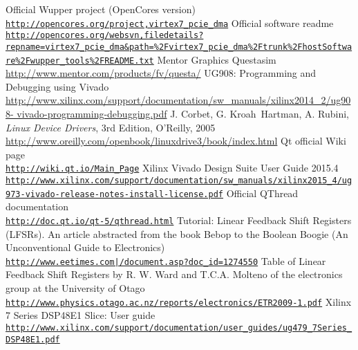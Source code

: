 \begin{thebibliography}{9}
  Official Wupper project (OpenCores version)\\
  \href{http://opencores.org/project,virtex7_pcie_dma}{\nolinkurl{http://opencores.org/project,virtex7\_pcie\_dma}}
  Official software readme\\
  \href{http://opencores.org/websvn,filedetails?repname=virtex7\_pcie\_dma&path=\%2Fvirtex7_pcie_dma\%2Ftrunk\%2FhostSoftware\%2Fwupper_tools\%2FREADME.txt}{\nolinkurl{http://opencores.org/websvn,filedetails?repname=virtex7_pcie_dma&path=\%2Fvirtex7_pcie_dma\%2Ftrunk\%2FhostSoftware\%2Fwupper_tools\%2FREADME.txt}}
  Mentor Graphics Questasim\\
  \href{http://www.mentor.com/products/fv/questa/}{http://www.mentor.com/products/fv/questa/}
  UG908: Programming and Debugging using Vivado\\
  \href{http://www.xilinx.com/support/documentation/sw_manuals/xilinx2014_2/ug908-vivado-programming-debugging.pdf}{http://www.xilinx.com/support/documentation/sw\_manuals/xilinx2014\_2/ug908- vivado-programming-debugging.pdf}
  J. Corbet, G. Kroah\ Hartman, A. Rubini, \textit{Linux Device Drivers}, 3rd Edition, O'Reilly, 2005\\
  \href{http://www.oreilly.com/openbook/linuxdrive3/book/index.html}{http://www.oreilly.com/openbook/linuxdrive3/book/index.html}
  Qt official Wiki page\\
  \href{http://wiki.qt.io/Main_Page}{\nolinkurl{http://wiki.qt.io/Main\_Page}}
  Xilinx Vivado Design Suite User Guide 2015.4\\
  \href{http://www.xilinx.com/support/documentation/sw_manuals/xilinx2015_4/ug973-vivado-release-notes-install-license.pdf}{\nolinkurl{http://www.xilinx.com/support/documentation/sw\_manuals/xilinx2015\_4/ug973-vivado-release-notes-install-license.pdf}}
  Official QThread documentation\\
  \href{http://doc.qt.io/qt-5/qthread.html}{\nolinkurl{http://doc.qt.io/qt-5/qthread.html}}
  Tutorial: Linear Feedback Shift Registers (LFSRs). An article abstracted from the book Bebop to the Boolean Boogie (An Unconventional Guide to Electronics)\\
  \href{http://www.eetimes.com/document.asp?doc_id=1274550}{\nolinkurl{http://www.eetimes.com|/document.asp?doc\_id=1274550}}
  Table of Linear Feedback Shift Registers by R. W. Ward and T.C.A. Molteno of the electronics group at the University of Otago\\
  \href{http://www.physics.otago.ac.nz/reports/electronics/ETR2009-1.pdf}{\nolinkurl{http://www.physics.otago.ac.nz/reports/electronics/ETR2009-1.pdf}}
  Xilinx 7 Series DSP48E1 Slice: User guide\\
  \href{http://www.xilinx.com/support/documentation/user_guides/ug479_7Series_DSP48E1.pdf}{\nolinkurl{http://www.xilinx.com/support/documentation/user\_guides/ug479\_7Series\_DSP48E1.pdf}}	
  

\end{thebibliography}
